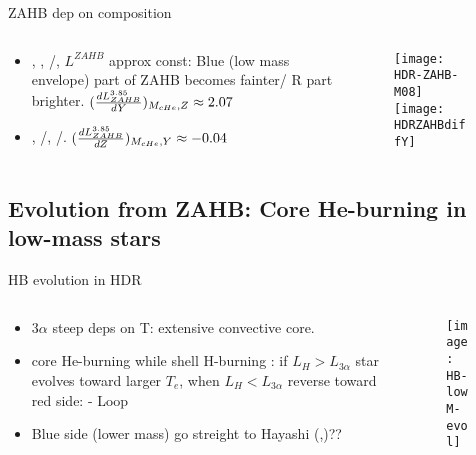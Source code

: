 \begin{frame}{ZAHB dep on composition}
\begin{columns}[T]
\begin{column}{0.55\textwidth}
\begin{itemize}
    \item {}, , /, $L^{ZAHB}$ approx const: Blue (low mass envelope) part of ZAHB becomes fainter/ R part brighter. $(\TDy{Y}{L_{ZAHB}^{3.85}})_{M_{cHe},Z}\approx2.07$
\item {}, /, /. $(\TDy{Z}{L_{ZAHB}^{3.85}})_{M_{cHe},Y}\approx-0.04$
\end{itemize}
\end{column}
\begin{column}{0.45\textwidth}
\begin{figure}[!ht]
\texttt{[image: HDR-ZAHB-M08]}\label{fig:HDR-ZAHB-M08}
\texttt{[image: HDRZAHBdiffY]}\label{fig:HDRZAHBdiffY}
\end{figure}
\end{column}
\end{columns}
\end{frame}

\subsection{Evolution from ZAHB: Core He-burning in low-mass stars}


\begin{frame}{HB evolution in HDR}
\begin{columns}[T]
\begin{column}{0.4\textwidth}
\begin{itemize}
    \item $3\alpha$ steep deps on T: extensive convective core.
    \item core He-burning  while shell H-burning : if $L_H>L_{3\alpha}$ star evolves toward larger $T_e$, when $L_H<L_{3\alpha}$ reverse toward red side: - Loop
    \item Blue side (lower mass) go streight to Hayashi (,)??
\end{itemize}
\end{column}
\begin{column}{0.6\textwidth}
\begin{figure}[!ht]
\texttt{[image: HB-lowM-evol]}\label{fig:HB-lowM-evol}
\end{figure}
\end{column}
\end{columns}
\end{frame}

